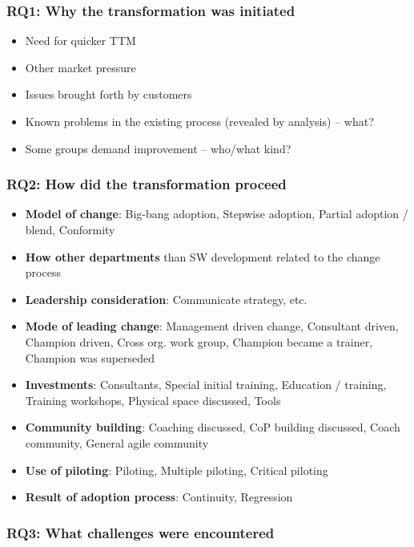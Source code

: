 \subsubsection*{RQ1: Why the transformation was initiated}

\begin{itemize}
  \item Need for quicker TTM
  \item Other market pressure
  \item Issues brought forth by customers
  \item Known problems in the existing process (revealed by analysis) -- what?
  \item Some groups demand improvement -- who/what kind?
\end{itemize}


\subsubsection*{RQ2: How did the transformation proceed}

\begin{itemize}
  \item \textbf{Model of change}: Big-bang adoption, Stepwise adoption, Partial adoption / blend, Conformity
  \item \textbf{How other departments} than SW development related to the change process
  \item \textbf{Leadership consideration}: Communicate strategy, etc.
  \item \textbf{Mode of leading change}: Management driven change, Consultant driven, Champion driven, Cross org. work group, Champion became a trainer, Champion was superseded
  \item \textbf{Investments}: Consultants, Special initial training, Education / training, Training workshops, Physical space discussed, Tools
  \item \textbf{Community building}: Coaching discussed, CoP building discussed, Coach community, General agile community
  \item \textbf{Use of piloting}: Piloting, Multiple piloting, Critical piloting
  \item \textbf{Result of adoption process}: Continuity, Regression
\end{itemize}


\subsubsection*{RQ3: What challenges were encountered}

